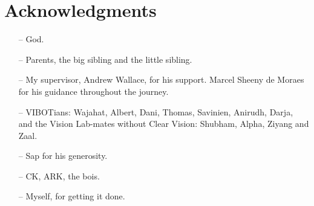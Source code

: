 \doublespacing

\setcounter{page}{1} \pagestyle{plain}


\tableofcontents

\listoffigures
\listoftables

\chapter*{Acknowledgments}
         {\protect{}}
\begin{itemize}
\item[--] God.
\item[--] Parents, the big sibling and the little sibling.
\item[--] My supervisor, Andrew Wallace, for his support. Marcel Sheeny de Moraes for his guidance throughout the journey.
\item[--] VIBOTians: Wajahat, Albert, Dani, Thomas, Savinien, Anirudh, Darja, and the Vision Lab-mates without Clear Vision: Shubham, Alpha, Ziyang and Zaal.
\item[--] Sap for his generosity.
\item[--] CK, ARK, the bois.
\item[--] Myself, for getting it done.
\end{itemize}

\pagestyle{fancy}